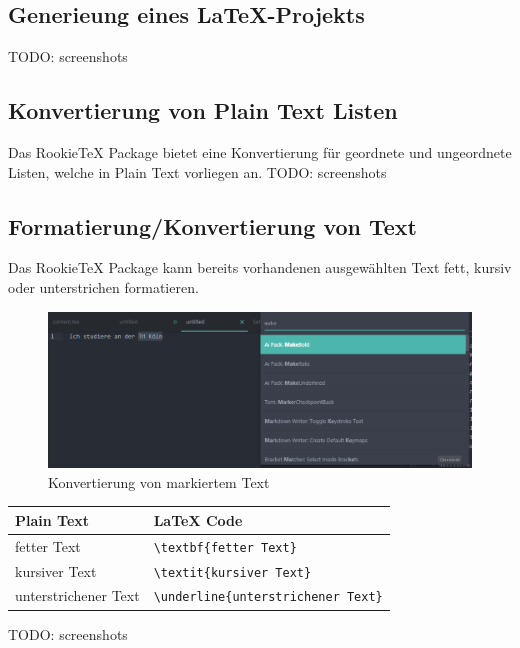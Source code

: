         \subsection{Generieung eines LaTeX-Projekts}
            TODO: screenshots

        \subsection{Konvertierung von Plain Text Listen}
            Das RookieTeX Package bietet eine Konvertierung für geordnete und ungeordnete Listen, welche in Plain Text vorliegen an.
            TODO: screenshots

        \subsection{Formatierung/Konvertierung von Text}
            Das RookieTeX Package kann bereits vorhandenen ausgewählten Text fett, kursiv oder unterstrichen formatieren.
            \\[5mm]
            \begin{figure}[h]
                \includegraphics[scale=0.5]{img/make_bold_example.png}
                \caption{Konvertierung von markiertem Text}
            \end{figure}
            \begin{minipage}{\textwidth}
                \begin{tabular}{ | l | l | }
                    \hline
                    \textbf{Plain Text} & \textbf{LaTeX Code} \\
                    \hline
                    fetter Text & \texttt{\textbackslash textbf\{fetter Text\}} \\
                    kursiver Text & \texttt{\textbackslash textit\{kursiver Text\}} \\
                    unterstrichener Text & \texttt{\textbackslash underline\{unterstrichener Text\}} \\
                    \hline
                \end{tabular}
            \end{minipage}
            TODO: screenshots

